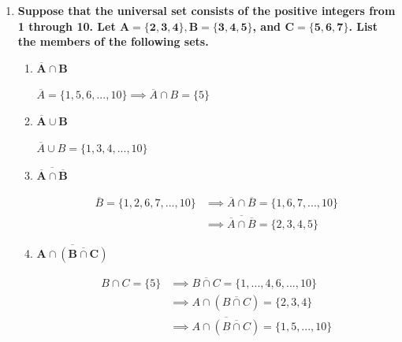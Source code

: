 \documentclass[10pt, oneside]{article}
\begin{document}
\begin{enumerate}[label=1.\arabic*]
\itemsep0em 
\item  \begin{tcolorbox}[
  colback=Cerulean!5!white,
  colframe=Cerulean!75!black]
\textbf{Suppose that the universal set consists of the positive integers from 1 through 10. Let $\bm{A = \{ 2, 3, 4 \}, B = \{ 3, 4, 5 \}}$, and $\bm{C = \{ 5, 6, 7 \}}$. List the members of the following sets.}
\end{tcolorbox}

	\begin{enumerate} 
	\item  \begin{tcolorbox}[
	  colback=Cerulean!5!white,
	  colframe=Cerulean!75!black]
	\textbf{$\bm{\overline{A} \cap B}$}
	\end{tcolorbox}
	
	$\overline{A} = \{1, 5, 6, ..., 10 \} \implies \boxed{\overline{A} \cap B = \{ 5 \}}$
	
	\item  \begin{tcolorbox}[
	  colback=Cerulean!5!white,
	  colframe=Cerulean!75!black]
	\textbf{$\bm{\overline{A} \cup B}$}
	\end{tcolorbox}
	
	$\boxed{\overline{A} \cup B = \{ 1, 3, 4, ..., 10 \}}$
	
	\item  \begin{tcolorbox}[
	  colback=Cerulean!5!white,
	  colframe=Cerulean!75!black]
	\textbf{$\bm{\overline{\overline{A} \cap \overline{B}}}$}
	\end{tcolorbox}
	
	\begin{align*}
	\overline{B} = \{ 1, 2, 6, 7, ..., 10 \} &\implies \overline{A} \cap \overline{B} = \{ 1, 6, 7, ..., 10\} \\
	&\implies \boxed{ \overline{\overline{A} \cap \overline{B}} = \{2, 3, 4, 5 \} }
	\end{align*}
	
	\item  \begin{tcolorbox}[
	  colback=Cerulean!5!white,
	  colframe=Cerulean!75!black]
	\textbf{$\bm{\overline{A \cap (\overline{B \cap C})}}$}
	\end{tcolorbox}
	
	\begin{align*}
	B \cap C = \{ 5 \} &\implies \overline{B \cap C} = \{ 1, ..., 4, 6, ..., 10 \} \\
	&\implies A \cap (\overline{B \cap C}) = \{ 2, 3, 4 \} \\
	&\implies \boxed{ \overline{A \cap (\overline{B \cap C})} = \{ 1, 5, ..., 10 \} }
	\end{align*}
	

\end{enumerate}
\end{enumerate}
\end{document}
